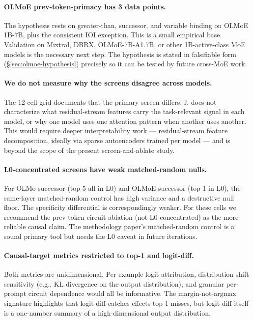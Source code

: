 \documentclass[11pt]{article}
\begin{document}
\paragraph{OLMoE prev-token-primacy has 3 data points.}
The hypothesis rests on greater-than, successor, and variable binding on OLMoE 1B-7B, plus the consistent IOI exception. This is a small empirical base. Validation on Mixtral, DBRX, OLMoE-7B-A1.7B, or other 1B-active-class MoE models is the necessary next step. The hypothesis is stated in falsifiable form (\S\ref{sec:olmoe-hypothesis}) precisely so it can be tested by future cross-MoE work.

\paragraph{We do not measure why the screens disagree across models.}
The 12-cell grid documents that the primary screen differs; it does not characterize what residual-stream features carry the task-relevant signal in each model, or why one model uses one attention pattern when another uses another. This would require deeper interpretability work --- residual-stream feature decomposition, ideally via sparse autoencoders trained per model --- and is beyond the scope of the present screen-and-ablate study.

\paragraph{L0-concentrated screens have weak matched-random nulls.}
For OLMo successor (top-5 all in L0) and OLMoE successor (top-1 in L0), the same-layer matched-random control has high variance and a destructive null floor. The specificity differential is correspondingly weaker. For these cells we recommend the prev-token-circuit ablation (not L0-concentrated) as the more reliable causal claim. The methodology paper's matched-random control is a sound primary tool but needs the L0 caveat in future iterations.

\paragraph{Causal-target metrics restricted to top-1 and logit-diff.}
Both metrics are unidimensional. Per-example logit attribution, distribution-shift sensitivity (e.g., KL divergence on the output distribution), and granular per-prompt circuit dependence would all be informative. The margin-not-argmax signature highlights that logit-diff catches effects top-1 misses, but logit-diff itself is a one-number summary of a high-dimensional output distribution.
\end{document}

